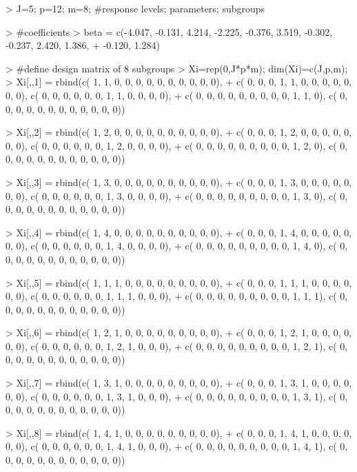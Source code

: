 \begin{example}
> J=5; p=12; m=8; #response levels; parameters; subgroups

> #coefficients
> beta = c(-4.047, -0.131, 4.214, -2.225, -0.376, 3.519, -0.302, -0.237,  2.420, 1.386,
+ -0.120,  1.284)

> #define design matrix of 8 subgroups
> Xi=rep(0,J*p*m); dim(Xi)=c(J,p,m);
> Xi[,,1] = rbind(c( 1, 1, 0, 0, 0, 0, 0, 0, 0, 0, 0, 0),
+           c( 0, 0, 0, 1, 1, 0, 0, 0, 0, 0, 0, 0), c( 0, 0, 0, 0, 0, 0, 1, 1, 0, 0, 0, 0),
+           c( 0, 0, 0, 0, 0, 0, 0, 0, 0, 1, 1, 0), c( 0, 0, 0, 0, 0, 0, 0, 0, 0, 0, 0, 0))

> Xi[,,2] = rbind(c( 1, 2, 0, 0, 0, 0, 0, 0, 0, 0, 0, 0),
+           c( 0, 0, 0, 1, 2, 0, 0, 0, 0, 0, 0, 0), c( 0, 0, 0, 0, 0, 0, 1, 2, 0, 0, 0, 0),
+           c( 0, 0, 0, 0, 0, 0, 0, 0, 0, 1, 2, 0), c( 0, 0, 0, 0, 0, 0, 0, 0, 0, 0, 0, 0))

> Xi[,,3] = rbind(c( 1, 3, 0, 0, 0, 0, 0, 0, 0, 0, 0, 0),
+           c( 0, 0, 0, 1, 3, 0, 0, 0, 0, 0, 0, 0), c( 0, 0, 0, 0, 0, 0, 1, 3, 0, 0, 0, 0),
+           c( 0, 0, 0, 0, 0, 0, 0, 0, 0, 1, 3, 0), c( 0, 0, 0, 0, 0, 0, 0, 0, 0, 0, 0, 0))

> Xi[,,4] = rbind(c( 1, 4, 0, 0, 0, 0, 0, 0, 0, 0, 0, 0),
+           c( 0, 0, 0, 1, 4, 0, 0, 0, 0, 0, 0, 0), c( 0, 0, 0, 0, 0, 0, 1, 4, 0, 0, 0, 0),
+           c( 0, 0, 0, 0, 0, 0, 0, 0, 0, 1, 4, 0), c( 0, 0, 0, 0, 0, 0, 0, 0, 0, 0, 0, 0))

> Xi[,,5] = rbind(c( 1, 1, 1, 0, 0, 0, 0, 0, 0, 0, 0, 0),
+           c( 0, 0, 0, 1, 1, 1, 0, 0, 0, 0, 0, 0), c( 0, 0, 0, 0, 0, 0, 1, 1, 1, 0, 0, 0),
+           c( 0, 0, 0, 0, 0, 0, 0, 0, 0, 1, 1, 1), c( 0, 0, 0, 0, 0, 0, 0, 0, 0, 0, 0, 0))

> Xi[,,6] = rbind(c( 1, 2, 1, 0, 0, 0, 0, 0, 0, 0, 0, 0),
+           c( 0, 0, 0, 1, 2, 1, 0, 0, 0, 0, 0, 0), c( 0, 0, 0, 0, 0, 0, 1, 2, 1, 0, 0, 0),
+           c( 0, 0, 0, 0, 0, 0, 0, 0, 0, 1, 2, 1), c( 0, 0, 0, 0, 0, 0, 0, 0, 0, 0, 0, 0))

> Xi[,,7] = rbind(c( 1, 3, 1, 0, 0, 0, 0, 0, 0, 0, 0, 0),
+           c( 0, 0, 0, 1, 3, 1, 0, 0, 0, 0, 0, 0), c( 0, 0, 0, 0, 0, 0, 1, 3, 1, 0, 0, 0),
+           c( 0, 0, 0, 0, 0, 0, 0, 0, 0, 1, 3, 1), c( 0, 0, 0, 0, 0, 0, 0, 0, 0, 0, 0, 0))

> Xi[,,8] = rbind(c( 1, 4, 1, 0, 0, 0, 0, 0, 0, 0, 0, 0),
+           c( 0, 0, 0, 1, 4, 1, 0, 0, 0, 0, 0, 0), c( 0, 0, 0, 0, 0, 0, 1, 4, 1, 0, 0, 0),
+           c( 0, 0, 0, 0, 0, 0, 0, 0, 0, 1, 4, 1), c( 0, 0, 0, 0, 0, 0, 0, 0, 0, 0, 0, 0))
\end{example}

